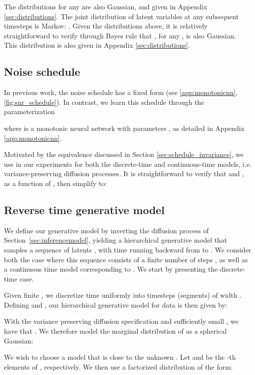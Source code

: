 \documentclass{article}
\begin{document}
The distributions  for any  are also Gaussian, and given in Appendix \ref{sec:distributions}. The joint distribution of latent variables  at any subsequent timesteps  is Markov: . Given the distributions above, it is relatively straightforward to verify through Bayes rule that , for any , is also Gaussian. This distribution is also given in Appendix \ref{sec:distributions}. 

\subsection{Noise schedule}
\label{sec:learning_noise}

In previous work, the noise schedule has a fixed form (see \cref{app:monotonicnn}, \cref{fig:snr_schedule}). In contrast, we learn this schedule through the parameterization

where  is a monotonic neural network with parameters , as detailed in Appendix \ref{app:monotonicnn}.

Motivated by the equivalence discussed in Section \ref{sec:schedule_invariance}, we use  in our experiments for both the discrete-time and continuous-time models, i.e. variance-preserving diffusion processes. It is straightforward to verify that  and , as a function of , then simplify to:





\subsection{Reverse time generative model}\label{sec:generativemodel}
We define our generative model by inverting the diffusion process of Section~\ref{sec:inferencemodel}, yielding a hierarchical generative model that samples a sequence of latents , with time running backward from  to .
We consider both the case where this sequence consists of a finite number of steps , as well as a continuous time model corresponding to . We start by presenting the discrete-time case. 

Given finite , we discretize time uniformly into  timesteps (segments) of width . Defining  and , our hierarchical generative model for data  is then given by:

With the variance preserving diffusion specification and sufficiently small , we have that . We therefore model the marginal distribution of  as a spherical Gaussian: 

We wish to choose a model  that is close to the unknown . Let  and  be the -th elements of , respectively. We then use a factorized distribution of the form:
\end{document}
